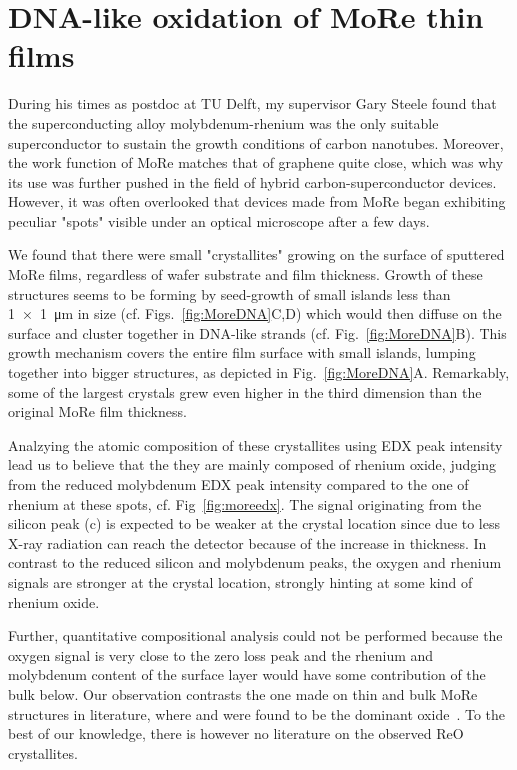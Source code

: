 \clearpage
\section{DNA-like oxidation of MoRe thin films}
\label{sec:more}

During his times as postdoc at TU Delft, my supervisor Gary Steele found that the superconducting alloy molybdenum-rhenium was the only suitable superconductor to sustain the growth conditions of carbon nanotubes.
Moreover, the work function of MoRe matches that of graphene quite close, which was why its use was further pushed in the field of hybrid carbon-superconductor devices.
However, it was often overlooked that devices made from MoRe began exhibiting peculiar "spots" visible under an optical microscope after a few days.

We found that there were small "crystallites" growing on the surface of sputtered MoRe films, regardless of wafer substrate and film thickness.
Growth of these structures seems to be forming by seed-growth of small islands less than \SI{1x1}{\micro\meter} in size (cf. Figs.~\ref{fig:MoreDNA}C,D) which would then diffuse on the surface and cluster together in DNA-like strands (cf. Fig.~\ref{fig:MoreDNA}B).
This growth mechanism covers the entire film surface with small islands, lumping together into bigger structures, as depicted in Fig.~\ref{fig:MoreDNA}A.
Remarkably, some of the largest crystals grew even higher in the third dimension than the original MoRe film thickness.

Analzying the atomic composition of these crystallites using EDX peak intensity lead us to believe that the they are mainly composed of rhenium oxide, judging from the reduced molybdenum EDX peak intensity compared to the one of rhenium at these spots, cf. Fig~\ref{fig:moreedx}.
The signal originating from the silicon peak (c) is expected to be weaker at the crystal location since due to less X-ray radiation can reach the detector because of the increase in thickness.
In contrast to the reduced silicon and molybdenum peaks, the oxygen and rhenium signals are stronger at the crystal location, strongly hinting at some kind of rhenium oxide.

Further, quantitative compositional analysis could not be performed because the oxygen signal is very close to the zero loss peak and the rhenium and molybdenum content of the surface layer would have some contribution of the bulk below.
Our observation contrasts the one made on thin and bulk MoRe structures in literature, where  and  were found to be the dominant oxide~\cite{seleznevDepositionCharacterizationFewnanometersthick2008b,gotzCosputteredMoReThin2016}.
To the best of our knowledge, there is however no literature on the observed ReO crystallites.

